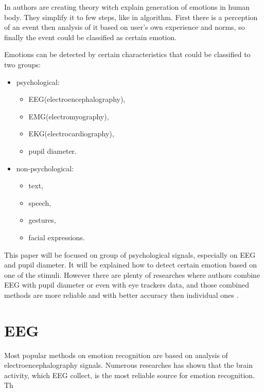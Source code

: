 \documentclass[10pt,journal,compsoc,twoside]{IEEEtran}
\begin{document}
In \cite{OrtonyCloreCollins1988} authors are creating theory witch explain generation of emotions in human body. They simplify it to few steps, like in algorithm. First there is a perception of an event then analysis of it based on user's own experience and norms, so finally the event could be classified as certain emotion.

Emotions can be detected by certain characteristics that could be classified to two groups:
\begin{itemize}
	\item psychological:
	\begin{itemize}
		\item EEG(electroencephalography),
		\item EMG(electromyography), 
		\item EKG(electrocardiography), 
		\item pupil diameter.
	\end{itemize} 
	\item non-psychological: 
	\begin{itemize} 
		\item text, 
		\item speech,
		\item  gestures, 
		\item facial expressions.
	\end{itemize}
\end{itemize}
This paper will be focused on group of psychological signals, especially on EEG and pupil diameter. It will be explained how to detect certain emotion based on one of the stimuli. However there are plenty of researches where authors combine EEG with pupil diameter or even with eye trackers data, and those combined methods are more reliable and with better accuracy then individual ones \cite{WeiLongBoNanBaoLiang2014,CalvoDMello2010,SoleymaniPanticPun2002}. 





\section{EEG}

Most popular methods on emotion recognition are based on analysis of electroencephalography signals.  Numerous researches\cite{LinMusic,GaoMehmood,NieWangShiLu} has shown that the brain activity, which EEG collect, is the most reliable source for emotion recognition. Th
\end{document}

